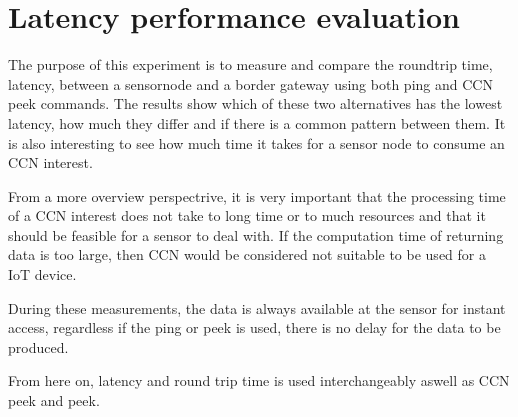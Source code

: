 
\section{Latency performance evaluation}
The purpose of this experiment is to measure and compare the roundtrip time, latency, between a sensornode and a border gateway using both ping and CCN peek commands. The results show which of these two alternatives has the lowest latency, how much they differ and if there is a common pattern between them. It is also interesting to see how much time it takes for a sensor node to consume an CCN interest. 

From a more overview perspectrive, it is very important that the processing time of a CCN interest does not take to long time or to much resources and that it should be feasible for a sensor to deal with. If the computation time of returning data is too large, then CCN would be considered not suitable to be used for a IoT device. 

During these measurements, the data is always available at the sensor for instant access, regardless if the ping or peek is used, there is no delay for the data to be produced. 

From here on, latency and round trip time is used interchangeably aswell as CCN peek and peek.





